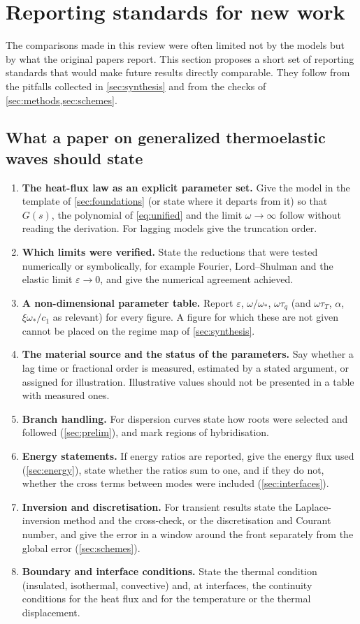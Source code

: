 \section{Reporting standards for new work}\label{sec:reporting}

The comparisons made in this review were often limited not by the models but by what the original papers report. This section proposes a short set of reporting standards that would make future results directly comparable. They follow from the pitfalls collected in \cref{sec:synthesis} and from the checks of \cref{sec:methods,sec:schemes}.

\subsection{What a paper on generalized thermoelastic waves should state}
\begin{enumerate}
\item \textbf{The heat-flux law as an explicit parameter set.} Give the model in the template of \cref{sec:foundations} (or state where it departs from it) so that $G(s)$, the polynomial of \cref{eq:unified} and the limit $\omega\to\infty$ follow without reading the derivation. For lagging models give the truncation order.
\item \textbf{Which limits were verified.} State the reductions that were tested numerically or symbolically, for example Fourier, Lord--Shulman and the elastic limit $\varepsilon\to0$, and give the numerical agreement achieved.
\item \textbf{A non-dimensional parameter table.} Report $\varepsilon$, $\omega/\omega_*$, $\omega\tau_q$ (and $\omega\tau_T$, $\alpha$, $\xi\omega_*/c_1$ as relevant) for every figure. A figure for which these are not given cannot be placed on the regime map of \cref{sec:synthesis}.
\item \textbf{The material source and the status of the parameters.} Say whether a lag time or fractional order is measured, estimated by a stated argument, or assigned for illustration. Illustrative values should not be presented in a table with measured ones.
\item \textbf{Branch handling.} For dispersion curves state how roots were selected and followed (\cref{sec:prelim}), and mark regions of hybridisation.
\item \textbf{Energy statements.} If energy ratios are reported, give the energy flux used (\cref{sec:energy}), state whether the ratios sum to one, and if they do not, whether the cross terms between modes were included (\cref{sec:interfaces}).
\item \textbf{Inversion and discretisation.} For transient results state the Laplace-inversion method and the cross-check, or the discretisation and Courant number, and give the error in a window around the front separately from the global error (\cref{sec:schemes}).
\item \textbf{Boundary and interface conditions.} State the thermal condition (insulated, isothermal, convective) and, at interfaces, the continuity conditions for the heat flux and for the temperature or the thermal displacement.
\end{enumerate}

